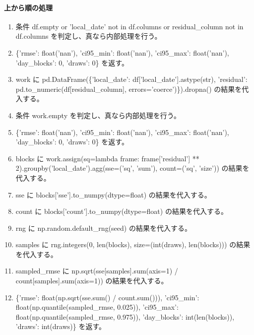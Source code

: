 \documentclass[a4paper,11pt]{article}
\begin{document}
            \paragraph{上から順の処理}
            \begin{enumerate}[leftmargin=1.8em]
            \item 条件 df.empty or 'local\_date' not in df.columns or residual\_column not in df.columns を判定し、真なら内部処理を行う。
\item   \{'rmse': float('nan'), 'ci95\_min': float('nan'), 'ci95\_max': float('nan'), 'day\_blocks': 0, 'draws': 0\} を返す。
\item work に pd.DataFrame(\{'local\_date': df['local\_date'].astype(str), 'residual': pd.to\_numeric(df[residual\_column], errors='coerce')\}).dropna() の結果を代入する。
\item 条件 work.empty を判定し、真なら内部処理を行う。
\item   \{'rmse': float('nan'), 'ci95\_min': float('nan'), 'ci95\_max': float('nan'), 'day\_blocks': 0, 'draws': 0\} を返す。
\item blocks に work.assign(sq=lambda frame: frame['residual'] ** 2).groupby('local\_date').agg(sse=('sq', 'sum'), count=('sq', 'size')) の結果を代入する。
\item sse に blocks['sse'].to\_numpy(dtype=float) の結果を代入する。
\item count に blocks['count'].to\_numpy(dtype=float) の結果を代入する。
\item rng に np.random.default\_rng(seed) の結果を代入する。
\item samples に rng.integers(0, len(blocks), size=(int(draws), len(blocks))) の結果を代入する。
\item sampled\_rmse に np.sqrt(sse[samples].sum(axis=1) / count[samples].sum(axis=1)) の結果を代入する。
\item \{'rmse': float(np.sqrt(sse.sum() / count.sum())), 'ci95\_min': float(np.quantile(sampled\_rmse, 0.025)), 'ci95\_max': float(np.quantile(sampled\_rmse, 0.975)), 'day\_blocks': int(len(blocks)), 'draws': int(draws)\} を返す。
            \end{enumerate}
\end{document}
